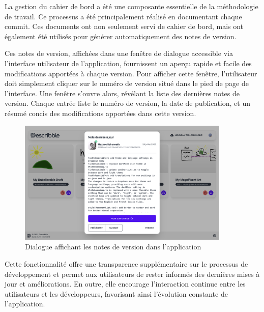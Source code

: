 La gestion du cahier de bord a été une composante essentielle de la méthodologie de travail. Ce processus a été principalement réalisé en documentant chaque commit. Ces documents ont non seulement servi de cahier de bord, mais ont également été utilisés pour générer automatiquement des notes de version.

Ces notes de version, affichées dans une fenêtre de dialogue accessible via l'interface utilisateur de l'application, fournissent un aperçu rapide et facile des modifications apportées à chaque version. Pour afficher cette fenêtre, l'utilisateur doit simplement cliquer sur le numéro de version situé dans le pied de page de l'interface. Une fenêtre s'ouvre alors, révélant la liste des dernières notes de version. Chaque entrée liste le numéro de version, la date de publication, et un résumé concis des modifications apportées dans cette version.

\begin{figure}[H]
    \centering
    \includegraphics[width=0.9\textwidth]{assets/figures/patch_notes.png}
    \caption{Dialogue affichant les notes de version dans l'application}
\end{figure}

Cette fonctionnalité offre une transparence supplémentaire sur le processus de développement et permet aux utilisateurs de rester informés des dernières mises à jour et améliorations. En outre, elle encourage l'interaction continue entre les utilisateurs et les développeurs, favorisant ainsi l'évolution constante de l'application.